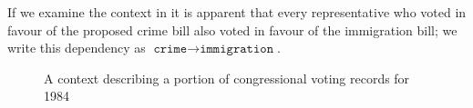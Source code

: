 If we examine the context in  it is apparent that every representative who voted in favour of the proposed crime bill also voted in favour of the immigration bill; we write this dependency as $\texttt{crime} \rightarrow \texttt{immigration}$. 



\begin{figure}[H]
\centering
    \begin{cxt}
    \end{cxt}
    \caption{A context describing a portion of congressional voting records for 1984}
    \label{context:voting-records-small}
\end{figure}

\clearpage

